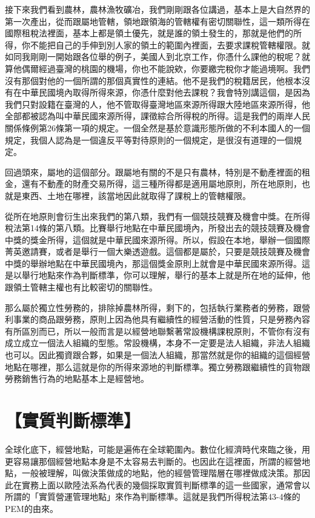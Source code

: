 \documentclass[]{ctexbook}
\begin{document}
接下來我們看到農林，農林漁牧礦冶，我們剛剛跟各位講過，基本上是大自然界的第一次產出，從而跟屬地管轄，領地跟領海的管轄權有密切關聯性，這一類所得在國際租稅法裡面，基本上都是領土優先，就是誰的領土發生的，那就是他們的所得，你不能把自己的手伸到別人家的領土的範圍內裡面，去要求課稅管轄權限。就如同我剛剛一開始跟各位舉的例子，美國人到北京工作，你憑什么課他的稅呢？就算他偶爾經過臺灣的桃園的機場，你也不能說欸，你要繳完稅你才能過境啊。我們沒有那個對他的一個所謂的那個真實性的連結。他不是我們的稅籍居民，他根本沒有在中華民國境內取得所得來源，你憑什麼對他去課稅？我會特別講這個，是因為我們只對設籍在臺灣的人，他不管取得臺灣地區來源所得跟大陸地區來源所得，他全部都被認為叫中華民國來源所得，課徵綜合所得稅的所得。這是我們的兩岸人民關係條例第26條第一項的規定。一個全然是基於意識形態所做的不利本國人的一個規定，我個人認為是一個違反平等對待原則的一個規定，是很沒有道理的一個規定。

回過頭來，屬地的這個部分。跟屬地有關的不是只有農林，特別是不動產裡面的租金，還有不動產的財產交易所得，這三種所得都是適用屬地原則，所在地原則，也就是東西、土地在哪裡，該當地因此就取得了課稅上的管轄權限。

從所在地原則會衍生出來我們的第八類，我們有一個競技競賽及機會中獎。在所得稅法第14條的第八類。比賽舉行地點在中華民國境內，所發出去的競技競賽及機會中獎的獎金所得，這個就是中華民國來源所得。所以，假設在本地，舉辦一個國際菁英邀請賽，或者是舉行一個大樂透遊戲。這個都是屬於，只要是競技競賽及機會中獎的舉辦地點在中華民國境內，那這個獎金原則上就會是中華民國來源所得。這是以舉行地點來作為判斷標準，你可以理解，舉行的基本上就是所在地的延伸，他跟領土管轄主權也有比較密切的關聯性。

那么屬於獨立性勞務的，排除掉農林所得，剩下的，包括執行業務者的勞務，跟營利事業的商品跟勞務，原則上因為他具有繼續性的經營活動的性質，只是勞務內容有所區別而已，所以一般而言是以經營地聯繫著常設機構課稅原則，不管你有沒有成立成立一個法人組織的型態。常設機構，本身不一定要是法人組織，非法人組織也可以。因此獨資跟合夥，如果是一個法人組織，那當然就是你的組織的這個經營地點在哪裡，那么這就是你的所得來源地的判斷標準。獨立勞務跟繼續性的貨物跟勞務銷售行為的地點基本上是經營地。

\hypertarget{ux5be6ux8ceaux5224ux65b7ux6a19ux6e96}{%
\section{【實質判斷標準】}\label{ux5be6ux8ceaux5224ux65b7ux6a19ux6e96}}

全球化底下，經營地點，可能是遍佈在全球範圍內。數位化經濟時代來臨之後，用更容易讓那個經營地點本身是不太容易去判斷的。也因此在這裡面，所謂的經營地點，一般被理解，叫做決策做成的地點，他的經營管理階層在哪裡做成決策。那因此在實務上面以歐陸法系為代表的幾個採取實質判斷標準的這一些國家，通常會以所謂的「實質營運管理地點」來作為判斷標準。這就是我們所得稅法第43-4條的PEM的由來。
\end{document}
